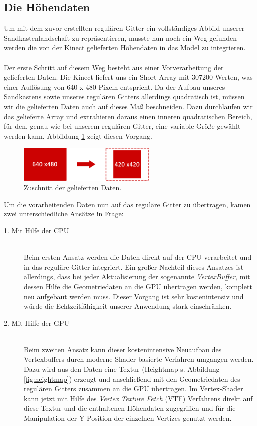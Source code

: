 \begin{Spacing}{\mylinespace}
\subsection{Die Höhendaten}
Um mit dem zuvor erstellten regulären Gitter ein vollständiges Abbild unserer Sandkastenlandschaft zu repräsentieren, musste nun noch ein Weg gefunden werden die von der Kinect gelieferten Höhendaten in das Model zu integrieren.
\\\\
Der erste Schritt auf diesem Weg besteht aus einer Vorverarbeitung der gelieferten Daten. Die Kinect liefert uns ein Short-Array mit 307200 Werten, was einer Auflösung von 640 x 480 Pixeln entspricht. Da der Aufbau unseres Sandkastens sowie unseres regulären Gitters allerdings quadratisch ist, müssen wir die gelieferten Daten auch auf dieses Maß beschneiden. Dazu durchlaufen wir das gelieferte Array und extrahieren daraus einen inneren quadratischen Bereich, für den, genau wie bei unserem regulären Gitter, eine variable Größe gewählt werden kann. Abbildung \ref{fig:resize} zeigt diesen Vorgang.     
\\
\begin{figure}[h!]
	\centering
	\includegraphics[width=250px]{graphics/resize.png}
	\caption{Zuschnitt der gelieferten Daten.}
	\label{fig:resize}
\end{figure}  

Um die vorarbeitenden Daten nun auf das reguläre Gitter zu übertragen, kamen zwei unterschiedliche Ansätze in Frage:
\begin{description}
	\item[1. Mit Hilfe der CPU] \hfill \\
	Beim ersten Ansatz werden die Daten direkt auf der CPU verarbeitet und in das reguläre Gitter integriert. Ein großer Nachteil dieses Ansatzes ist allerdings, dass bei jeder Aktualisierung der sogenannte \textit{VertexBuffer}, mit dessen Hilfe die Geometriedaten an die GPU übertragen werden, komplett neu aufgebaut werden muss. Dieser Vorgang ist sehr kostenintensiv und würde die Echtzeitfähigkeit unserer Anwendung stark einschränken.
	\item[2. Mit Hilfe der GPU] \hfill \\
	Beim zweiten Ansatz kann dieser kostenintensive Neuaufbau des Vertexbuffers durch moderne Shader-basierte Verfahren umgangen werden. Dazu wird aus den Daten eine Textur (Heightmap s. Abbildung \ref{fig:heightmap}) erzeugt und anschließend mit den Geometriedaten des regulären Gitters zusammen an die GPU übertragen. Im Vertex-Shader kann jetzt mit Hilfe des \textit{Vertex Texture Fetch} (VTF) Verfahrens direkt auf diese Textur und die enthaltenen Höhendaten zugegriffen und für die Manipulation der Y-Position der einzelnen Vertizes genutzt werden.
\end{description}


\end{Spacing}

